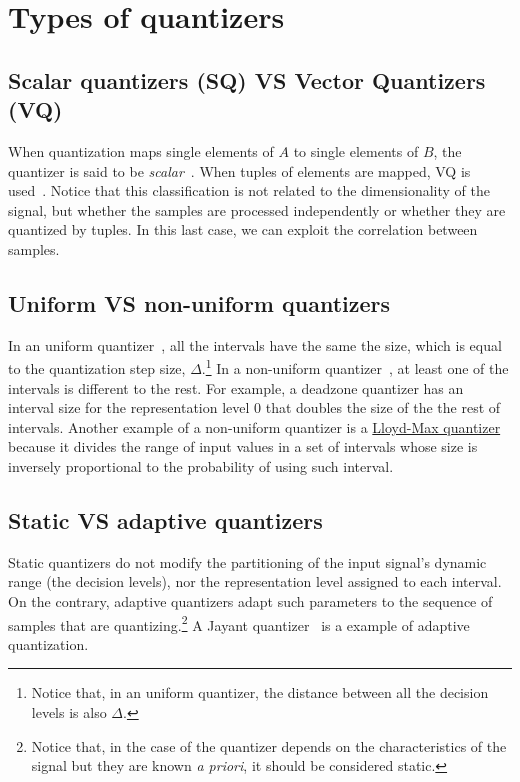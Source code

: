 \section{Types of quantizers}

\subsection{Scalar quantizers (SQ) VS Vector Quantizers (VQ)}

When quantization maps single elements of $A$ to single elements of
$B$, the quantizer is said to be
\emph{scalar}~\cite{vruiz__scalar_quantization}. When tuples of
elements are mapped, VQ is
used~\cite{vruiz__vector_quantization}. Notice that this
classification is not related to the dimensionality of the signal, but
whether the samples are processed independently or whether they are
quantized by tuples. In this last case, we can exploit the correlation
between samples.

\subsection{Uniform VS non-uniform quantizers}

In an uniform quantizer~\cite{vruiz__scalar_quantization}, all the
intervals have the same the size, which is equal to the quantization
step size, $\Delta$.\footnote{Notice that, in an uniform quantizer,
  the distance between all the decision levels is also $\Delta$.} In a
non-uniform quantizer~\cite{vruiz__scalar_quantization}, at least one
of the intervals is different to the rest. For example, a deadzone
quantizer \cite{vruiz__scalar_quantization} has an interval size for
the representation level 0 that doubles the size of the the rest of
intervals. Another example of a non-uniform quantizer is a
\href{https://en.wikipedia.org/wiki/Lloyd%27s_algorithm}{Lloyd-Max
  quantizer} \cite{vruiz__scalar_quantization} because it divides the
range of input values in a set of intervals whose size is inversely
proportional to the probability of using such interval.

\subsection{Static VS adaptive quantizers}

Static quantizers do not modify the partitioning of the input signal's
dynamic range (the decision levels), nor the representation level
assigned to each interval. On the contrary, adaptive quantizers adapt
such parameters to the sequence of samples that are
quantizing.\footnote{Notice that, in the case of the quantizer depends
  on the characteristics of the signal but they are known \emph{a
    priori}, it should be considered static.} A Jayant
quantizer~\cite{vruiz__scalar_quantization} is a example of adaptive
quantization.


